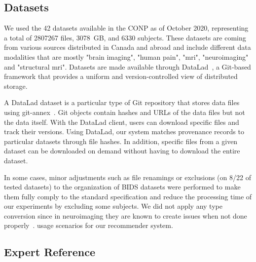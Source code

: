 \documentclass[conference]{IEEEtran}
\begin{document}
\subsection{Datasets} 

We used the 42 datasets available in the CONP as of October 2020,
representing a total of 2807267 files, 3078~GB, and 6330 subjects.
These datasets are coming from various sources distributed in Canada and abroad and include different data modalities that are mostly "brain imaging", "human pain", "mri", "neuroimaging" and "structural mri". 
 Datasets are made available through DataLad~\cite{datalad2021},
a Git-based framework that provides a uniform and version-controlled view of
distributed storage.

A DataLad dataset is a particular type of Git repository that stores
 data files using git-annex~\cite{gitannex}. Git objects contain
hashes and URLs of the data files but not the data itself. With the DataLad
client, users can download specific files and track their versions. Using
DataLad, our system matches provenance records to particular datasets
through file hashes. In addition, specific files from a given dataset can
be downloaded on demand without having to download the entire dataset. 

 In some cases, minor adjustments such as file renamings or exclusions (on 8/22 of tested datasets) to the organization of BIDS datasets were performed to make them fully comply to the standard specification and reduce the processing time of our experiments by excluding some subjects. We did not apply any type conversion since in neuroimaging they are known to create issues when not done properly~\cite{li2016first}. 
 usage scenarios for our recommender system.
 


\subsection{Expert Reference}
\end{document}

